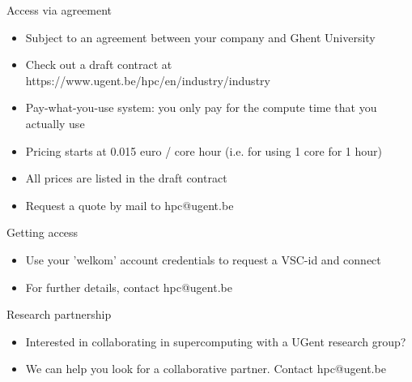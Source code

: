   \item Access via agreement
  \begin{itemize}
    \item Subject to an agreement between your company and Ghent University
    \item Check out a draft contract at https://www.ugent.be/hpc/en/industry/industry
    \item Pay-what-you-use system: you only pay for the compute time that you actually use
    \item Pricing starts at 0.015 euro / core hour (i.e. for using 1 core for 1 hour)
    \item All prices are listed in the draft contract
    \item Request a quote by mail to hpc@ugent.be
  \end{itemize}
  \item Getting access
  \begin{itemize}
    \item Use your 'welkom' account credentials to request a VSC-id and connect
    \item For further details, contact hpc@ugent.be
  \end{itemize}
  \item Research partnership
  \begin{itemize}
    \item Interested in collaborating in supercomputing with a UGent research group?
    \item We can help you look for a collaborative partner. Contact hpc@ugent.be
  \end{itemize}

